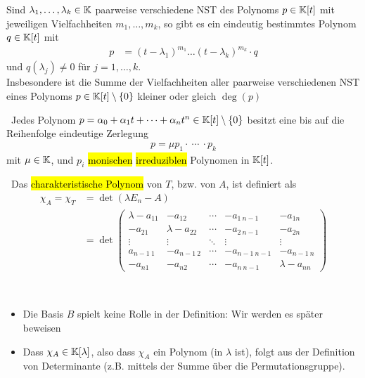 \begin{corollary}
Sind $\lambda_1,\dots,\lambda_k\in\mathbb{K}$ paarweise verschiedene NST des Polynoms $p\in\mathbb{K}[t]$ mit jeweiligen Vielfachheiten $m_1,\dots,m_k$, so gibt es ein eindeutig bestimmtes Polynom $q\in\mathbb{K}[t]$ mit 
\begin{align*}
    p&=(t-\lambda_1)^{m_1}\dots(t-\lambda_k)^{m_k}\cdot q
\end{align*}
und $q(\lambda_j)\neq0$ für $j=1,\dots,k$.\\
Insbesondere ist die Summe der Vielfachheiten aller paarweise verschiedenen NST eines Polynoms $p\in\mathbb{K}[t]\setminus\{0\}$ kleiner oder gleich $\deg(p)$
\end{corollary}

\begin{theorem}\,
Jedes Polynom $p=\alpha_0+\alpha_1t+\cdots+\alpha_nt^n\in\mathbb{K}[t]\setminus\{0\}$ besitzt eine bis auf die Reihenfolge eindeutige Zerlegung
\begin{align*}
    p = \mu p_1\cdot\ \cdots\ \cdot p_k
\end{align*}
mit $\mu\in\mathbb{K}$, und $p_i$ \hl{monischen} \hl{irreduziblen} Polynomen in $\mathbb{K}[t]$.
\end{theorem}

\begin{definition}\,
Das \hl{charakteristische Polynom} von $T$, bzw. von $A$, ist definiert als 
\begin{align*}
    \chi_A=\chi_T&=\det(\lambda E_n-A)\\
    &=\det
    \left( \begin{matrix}
        \lambda-a_{11} & -a_{12} & \cdots & -a_{1\ n-1} & -a_{1n} \\
        -a_{21} & \lambda-a_{22} & \cdots & -a_{2\ n-1} & -a_{2n} \\
        \vdots & \vdots & \ddots & \vdots & \vdots 
        \\a_{n-1\ 1} & -a_{n-1\ 2} & \cdots & -a_{n-1\ n-1} & -a_{n-1\ n} \\
        -a_{n1} & -a_{n2} & \cdots & -a_{n\ n-1} & \lambda-a_{nn} 
    \end{matrix}\right)
\end{align*}
\end{definition}

\begin{remark}\,
\begin{itemize}
    \item Die Basis $B$ spielt keine Rolle in der Definition: Wir werden es später beweisen
    \item Dass $\chi_A\in\mathbb{K}[\lambda]$, also dass $\chi_A$ ein Polynom (in $\lambda$ ist), folgt aus der Definition von Determinante (z.B. mittels der Summe über die Permutationsgruppe).
\end{itemize}
\end{remark}

